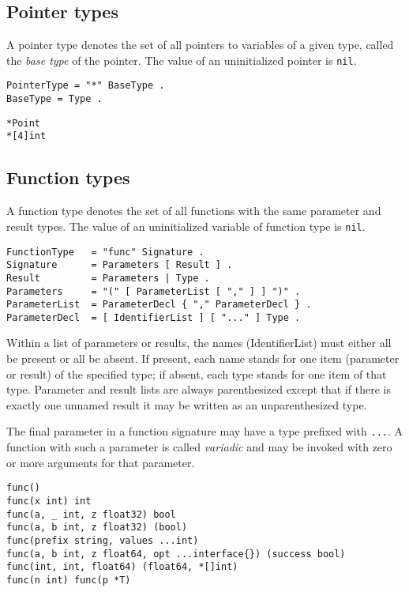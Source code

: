 \subsection*{Pointer types}

A pointer type denotes the set of all pointers to variables of a given
type, called the \emph{base type} of the pointer. The value of an
uninitialized pointer is \texttt{nil}.

\begin{Verbatim}[frame=single]
PointerType = "*" BaseType .
BaseType = Type .
\end{Verbatim}

\begin{Verbatim}[frame=single]
*Point
*[4]int
\end{Verbatim}

\subsection*{Function types}

A function type denotes the set of all functions with the same parameter
and result types. The value of an uninitialized variable of function
type is \texttt{nil}.

\begin{Verbatim}[frame=single]
FunctionType   = "func" Signature .
Signature      = Parameters [ Result ] .
Result         = Parameters | Type .
Parameters     = "(" [ ParameterList [ "," ] ] ")" .
ParameterList  = ParameterDecl { "," ParameterDecl } .
ParameterDecl  = [ IdentifierList ] [ "..." ] Type .
\end{Verbatim}

Within a list of parameters or results, the names (IdentifierList) must
either all be present or all be absent. If present, each name stands for
one item (parameter or result) of the specified type; if absent, each
type stands for one item of that type. Parameter and result lists are
always parenthesized except that if there is exactly one unnamed result
it may be written as an unparenthesized type.

The final parameter in a function signature may have a type prefixed
with \texttt{...}. A function with such a parameter is called
\emph{variadic} and may be invoked with zero or more arguments for that
parameter.

\begin{Verbatim}[frame=single]
func()
func(x int) int
func(a, _ int, z float32) bool
func(a, b int, z float32) (bool)
func(prefix string, values ...int)
func(a, b int, z float64, opt ...interface{}) (success bool)
func(int, int, float64) (float64, *[]int)
func(n int) func(p *T)
\end{Verbatim}

